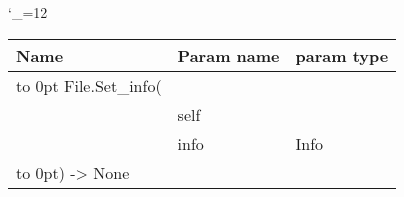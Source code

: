 \begingroup \catcode`\_=12 \tt
\begin{tabular}{lll}
\toprule
\textrm{Name}&\textrm{Param name}&\textrm{param type}\\
\midrule
\hbox to 0pt {File.Set_info(\hss}\\
& self\\
& info & Info\\
\hbox to 0pt{) -> None\hss}\\
\bottomrule
\end{tabular}
\endgroup
